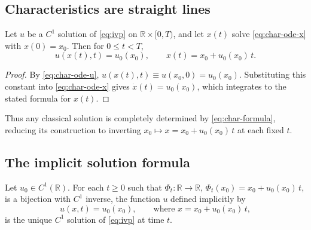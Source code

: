 \subsection{Characteristics are straight lines}
\label{subsec:char-lines}

\begin{proposition}
\label{prop:char-lines}
Let $u$ be a $C^1$ solution of \eqref{eq:ivp} on $\mathbb{R} \times
[0,T)$, and let $x(t)$ solve \eqref{eq:char-ode-x} with $x(0)=x_0$. Then
for $0 \le t < T$,
\begin{equation}
  \label{eq:char-formula}
  u(x(t), t) = u_0(x_0), \qquad x(t) = x_0 + u_0(x_0)\, t.
\end{equation}
\end{proposition}

\begin{proof}
By \eqref{eq:char-ode-u}, $u(x(t),t) \equiv u(x_0,0) = u_0(x_0)$.
Substituting this constant into \eqref{eq:char-ode-x} gives $\dot x(t) =
u_0(x_0)$, which integrates to the stated formula for $x(t)$.
\end{proof}

Thus any classical solution is completely determined by
\eqref{eq:char-formula}, reducing its construction to inverting $x_0
\mapsto x = x_0 + u_0(x_0)\, t$ at each fixed $t$.

\subsection{The implicit solution formula}
\label{subsec:char-implicit-formula}

\begin{theorem}
\label{thm:implicit-solution}
Let $u_0 \in C^1(\mathbb{R})$. For each $t \geq 0$ such that $\Phi_t :
\mathbb{R} \to \mathbb{R}$, $\Phi_t(x_0) = x_0 + u_0(x_0)\, t$, is a
bijection with $C^1$ inverse, the function $u$ defined implicitly by
\begin{equation}
  \label{eq:implicit-solution}
  u(x,t) = u_0(x_0), \qquad \text{where } x = x_0 + u_0(x_0)\, t,
\end{equation}
is the unique $C^1$ solution of \eqref{eq:ivp} at time $t$.
\end{theorem}

